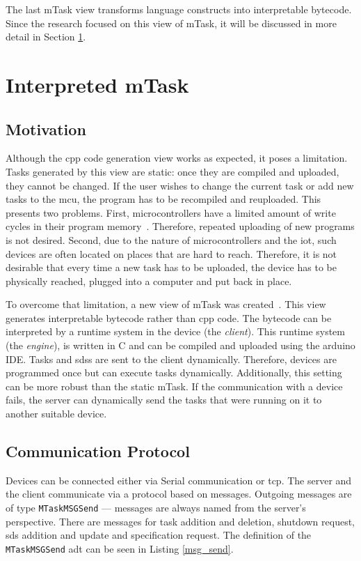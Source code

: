 The last \gls{mTask} view transforms language constructs into interpretable bytecode. Since the research focused on this view of \gls{mTask}, it will be discussed in more detail in Section \ref{sec:int_mtask}.

\section{Interpreted mTask}\label{sec:int_mtask}

\subsection{Motivation}

Although the \gls{cpp} code generation view works as expected, it poses a limitation. Tasks generated by this view are static: once they are compiled and uploaded, they cannot be changed. If the user wishes to change the current task or add new tasks to the \gls{mcu}, the program has to be recompiled and reuploaded. This presents two problems. First, microcontrollers have a limited amount of write cycles in their program memory~\cite{martthesis}. Therefore, repeated uploading of new programs is not desired. Second, due to the nature of microcontrollers and the \ac{iot}, such devices are often located on places that are hard to reach. Therefore, it is not desirable that every time a new task has to be uploaded, the device has to be physically reached, plugged into a computer and put back in place.

To overcome that limitation, a new view of \gls{mTask} was created~\cite{martthesis}. This view generates interpretable bytecode rather than \gls{cpp} code. The bytecode can be interpreted by a runtime system in the device (the \textit{client}). This runtime system (the \textit{engine}), is written in C and can be compiled and uploaded using the \gls{arduino} IDE. Tasks and \acp{sds} are sent to the client dynamically. Therefore, devices are programmed once but can execute tasks dynamically. Additionally, this setting can be more robust than the static \gls{mTask}. If the communication with a device fails, the server can dynamically send the tasks that were running on it to another suitable device. 

\subsection{Communication Protocol}\label{sec:mtask_com_prot}

Devices can be connected either via Serial communication or \acs{tcp}. The server and the client communicate via a protocol based on messages. Outgoing messages are of type \texttt{MTaskMSGSend} --- messages are always named from the server's perspective. There are messages for task addition and deletion, shutdown request, \ac{sds} addition and update and specification request. The definition of the \texttt{MTaskMSGSend} \ac{adt} can be seen in Listing \ref{msg_send}.

